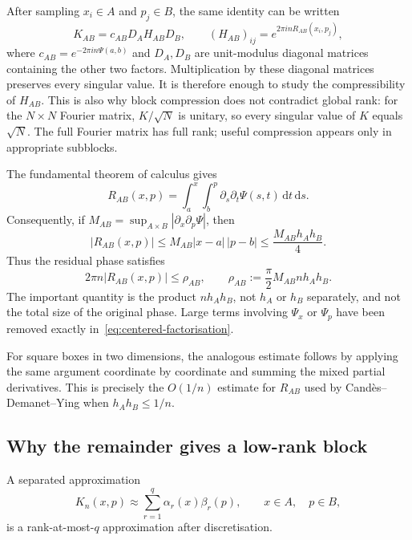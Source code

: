 After sampling $x_i\in A$ and $p_j\in B$, the same identity can be written
\begin{equation}
    K_{AB}=c_{AB}D_AH_{AB}D_B,
    \qquad (H_{AB})_{ij}=e^{2\pi i nR_{AB}(x_i,p_j)},
\end{equation}
where $c_{AB}=e^{-2\pi i n\Psi(a,b)}$ and $D_A,D_B$ are unit-modulus diagonal matrices containing the other two factors. Multiplication by these diagonal matrices preserves every singular value. It is therefore enough to study the compressibility of $H_{AB}$. This is also why block compression does not contradict global rank: for the $N\times N$ Fourier matrix, $K/\sqrt{N}$ is unitary, so every singular value of $K$ equals $\sqrt{N}$. The full Fourier matrix has full rank; useful compression appears only in appropriate subblocks.

The fundamental theorem of calculus gives
\begin{equation}
    R_{AB}(x,p)
    =\int_a^x\int_b^p \partial_s\partial_t\Psi(s,t)
      \,\mathrm{d}t\,\mathrm{d}s.
    \label{eq:mixed-integral}
\end{equation}
Consequently, if
$M_{AB}=\sup_{A\times B}|\partial_x\partial_p\Psi|$, then
\begin{equation}
    |R_{AB}(x,p)|
    \leq M_{AB}|x-a|\,|p-b|
    \leq \frac{M_{AB}h_Ah_B}{4}.
    \label{eq:rectangle-bound}
\end{equation}
Thus the residual phase satisfies
\begin{equation}
    2\pi n|R_{AB}(x,p)|
    \leq \rho_{AB},
    \qquad
    \rho_{AB}:=\frac{\pi}{2}M_{AB}n h_Ah_B.
    \label{eq:residual-phase-bound}
\end{equation}
The important quantity is the product $n h_Ah_B$, not $h_A$ or $h_B$ separately, and not the total size of the original phase. Large terms involving $\Psi_x$ or $\Psi_p$ have been removed exactly in~\eqref{eq:centered-factorisation}.

For square boxes in two dimensions, the analogous estimate follows by applying the same argument coordinate by coordinate and summing the mixed partial derivatives. This is precisely the $O(1/n)$ estimate for $R_{AB}$ used by Cand\`{e}s--Demanet--Ying when $h_Ah_B\leq 1/n$.

\subsection{Why the remainder gives a low-rank block}

A separated approximation
\begin{equation}
    K_n(x,p)\approx \sum_{r=1}^{q}\alpha_r(x)\beta_r(p),
    \qquad x\in A,\quad p\in B,
    \label{eq:separated-block}
\end{equation}
is a rank-at-most-$q$ approximation after discretisation.

